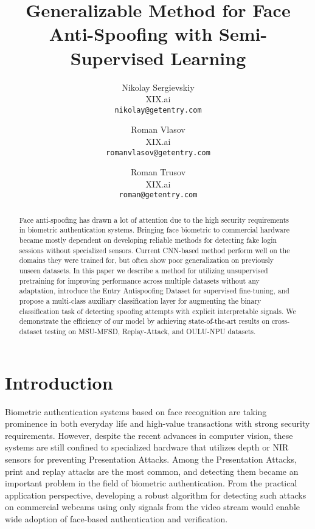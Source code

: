 \documentclass[10pt,twocolumn,letterpaper]{article}
\begin{document}
\title{Generalizable Method for Face Anti-Spoofing with Semi-Supervised Learning}

\author{Nikolay Sergievskiy\\
XIX.ai\\
{\tt\small nikolay@getentry.com}
\and
Roman Vlasov\\
XIX.ai\\
{\tt\small romanvlasov@getentry.com}
\and
Roman Trusov\\
XIX.ai\\
{\tt\small roman@getentry.com}
}
\maketitle

\begin{abstract}

    Face anti-spoofing has drawn a lot of attention due to the high security requirements in biometric authentication systems. Bringing face biometric to commercial hardware became mostly dependent on developing reliable methods for detecting fake login sessions without specialized sensors. Current CNN-based method perform well on the domains they were trained for, but often show poor generalization on previously unseen datasets. In this paper we describe a method for utilizing unsupervised pretraining for improving performance across multiple datasets without any adaptation, introduce the Entry Antispoofing Dataset for supervised fine-tuning, and propose a multi-class auxiliary classification layer for augmenting the binary classification task of detecting spoofing attempts with explicit interpretable signals. We demonstrate the efficiency of our model by achieving state-of-the-art results on cross-dataset testing on MSU-MFSD, Replay-Attack, and OULU-NPU datasets.
\end{abstract}

\section{Introduction}
\label{sec:intro}
Biometric authentication systems based on face recognition are taking prominence in both everyday life and high-value transactions with strong security requirements. However, despite the recent advances in computer vision, these systems are still confined to specialized hardware that utilizes depth or NIR sensors for preventing Presentation Attacks. Among the Presentation Attacks, print and replay attacks are the most common, and detecting them became an important problem in the field of biometric authentication. From the practical application perspective, developing a robust algorithm for detecting such attacks on commercial webcams using only signals from the video stream would enable wide adoption of face-based authentication and verification. 
\end{document}
